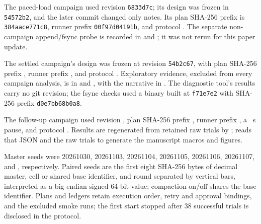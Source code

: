 The paced-load campaign used revision \texttt{6833d7c}; its design was frozen in \texttt{54572b2}, and the later commit changed only notes. Its plan SHA-256 prefix is \texttt{384aace771c8}, runner prefix \texttt{00f97d04191b}, and protocol . The separate non-campaign append/fsync probe is recorded in  and ; it was not rerun for this paper update.

The settled campaign's design was frozen at revision \texttt{54b2c67}, with plan SHA-256 prefix \texttt{\SettledPlanPrefix}, runner prefix \texttt{\SettledRunnerPrefix}, and protocol . Exploratory evidence, excluded from every campaign analysis, is in  and , with the narrative in . The diagnostic tool's results carry no git revision; the fsync checks used a binary built at \texttt{f71e7e2} with SHA-256 prefix \texttt{d0e7bb68b0a8}.

The follow-up campaign used revision \texttt{\FollowRevision}, plan SHA-256 prefix \texttt{\FollowPlanPrefix}, runner prefix \texttt{\FollowRunnerPrefix}, a \FollowPause{}~s pause, and protocol . Results are regenerated from retained raw trials by ;  reads that JSON and the raw trials to generate the manuscript macros and figures.

Master seeds were 20261030, 20261103, 20261104, 20261105, 20261106, 20261107, and \FollowSeed{}, respectively. Paired seeds are the first eight SHA-256 bytes of decimal master, cell or shared base identifier, and round separated by vertical bars, interpreted as a big-endian signed 64-bit value; compaction on/off shares the base identifier. Plans and ledgers retain execution order, retry and approval bindings, and the excluded smoke runs; the first start stopped after 38 successful trials is disclosed in the protocol.

